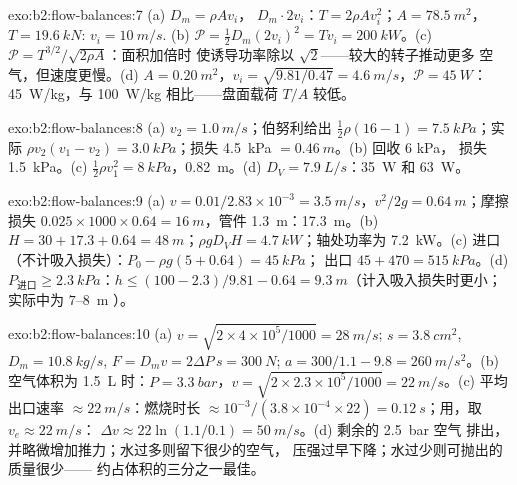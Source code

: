 \begin{solution}{exo:b2:flow-balances:7}
(a) $D_m = \rho Av_i$， $D_m\cdot2v_i$：$T = 2\rho Av_i^2$；$A = \qty{78.5}{m^2}$，
$T = \qty{19.6}{kN}$: $v_i = \qty{10}{m/s}$. (b) $\mathcal P = \tfrac12D_m(2v_i)^2 = Tv_i =
\qty{200}{kW}$。(c) $\mathcal P = T^{3/2}/\sqrt{2\rho A}$：面积加倍时
使诱导功率除以 $\sqrt2$——较大的转子推动更多
空气，但速度更慢。(d) $A = \qty{0.20}{m^2}$，$v_i = \sqrt{9.81/0.47} = \qty{4.6}{m/s}$，$\mathcal P
= \qty{45}{W}$：\qty{45}{W/kg}，与 \qty{100}{W/kg} 相比——盘面载荷 $T/A$
较低。
\end{solution}

\begin{solution}{exo:b2:flow-balances:8}
(a) $v_2 = \qty{1.0}{m/s}$；伯努利给出 $\tfrac12\rho(16 - 1) = \qty{7.5}{kPa}$；实际
$\rho v_2(v_1 - v_2) = \qty{3.0}{kPa}$；损失 \qty{4.5}{kPa} $= \qty{0.46}{m}$。(b) 回收 $6$ kPa，
损失 \qty{1.5}{kPa}。(c) $\tfrac12\rho v_1^2 = \qty{8}{kPa}$，\qty{0.82}{m}。(d)
$D_V = \qty{7.9}{L/s}$：\qty{35}{W} 和 \qty{63}{W}。
\end{solution}

\begin{solution}{exo:b2:flow-balances:9}
(a) $v = 0.01/2.83 \times 10^{-3} = \qty{3.5}{m/s}$，$v^2/2g = \qty{0.64}{m}$；摩擦损失
$0.025 \times 1000 \times 0.64 = \qty{16}{m}$，管件 \qty{1.3}{m}：\qty{17.3}{m}。(b)
$H = 30 + 17.3 + 0.64 = \qty{48}{m}$；$\rho gD_VH = \qty{4.7}{kW}$；轴处功率为
\qty{7.2}{kW}。(c) 进口（不计吸入损失）：$P_0 - \rho g(5 + 0.64) = \qty{45}{kPa}$；
出口 $45 + 470 = \qty{515}{kPa}$。(d) $P_{\text{进口}} \ge \qty{2.3}{kPa}$：$h \le (100 -
2.3)/9.81 - 0.64 = \qty{9.3}{m}$（计入吸入损失时更小；实际中为 $7$--\qty{8}{m}
）。
\end{solution}

\begin{solution}{exo:b2:flow-balances:10}
(a) $v = \sqrt{2 \times 4 \times 10^5/1000} = \qty{28}{m/s}$; $s = \qty{3.8}{cm^2}$, $D_m =
\qty{10.8}{kg/s}$, $F = D_mv = 2\Delta P\,s = \qty{300}{N}$; $a = 300/1.1 - 9.8 =
\qty{260}{m/s^2}$。(b) 空气体积为 \qty{1.5}{L} 时：$P = \qty{3.3}{bar}$，$v = \sqrt{2 \times 2.3 \times
10^5/1000} = \qty{22}{m/s}$。(c) 平均出口速率 $\approx \qty{22}{m/s}$：燃烧时长 $\approx 10^{-3}
/(3.8 \times 10^{-4} \times 22) = \qty{0.12}{s}$；用，取 $v_e \approx \qty{22}{m/s}$：
$\Delta v \approx 22\ln(1.1/0.1) = \qty{50}{m/s}$。(d) 剩余的 \qty{2.5}{bar} 空气
排出，并略微增加推力；水过多则留下很少的空气，
压强过早下降；水过少则可抛出的质量很少——
约占体积的三分之一最佳。
\end{solution}

